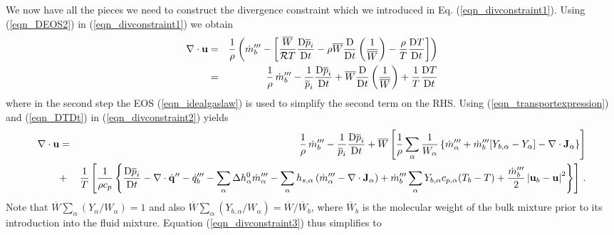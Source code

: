 \documentclass[11pt]{book}
\begin{document}
We now have all the pieces we need to construct the divergence constraint which we introduced in Eq. (\ref{eqn_divconstraint1}).  Using (\ref{eqn_DEOS2}) in (\ref{eqn_divconstraint1}) we obtain
\begin{eqnarray}
\label{eqn_divconstraint2}
\Div\mathbf{u} &=& \frac{1}{\rho} \left( \dot{m}_b^{\tripleprime} -  \left[ \frac{\overline{W}}{\mathcal{R}T} \frac{\mbox{D}\overline{p}_i}{\mbox{D} t} -
\rho \overline{W} \frac{\mbox{D}}{\mbox{D} t}\left(\frac{1}{\overline{W}}\right) - \frac{\rho}{T} \frac{\mbox{D} T}{\mbox{D} t} \right] \right)  \nonumber \vspace{0.3cm} \\
&=& \frac{1}{\rho} \,\dot{m}_b^{\tripleprime} -  \frac{1}{\overline{p}_i} \frac{\mbox{D}\overline{p}_i}{\mbox{D} t} + \overline{W} \frac{\mbox{D}}{\mbox{D} t}\left(\frac{1}{\overline{W}}\right) +
\frac{1}{T} \frac{\mbox{D} T}{\mbox{D} t}
\end{eqnarray}
where in the second step the EOS (\ref{eqn_idealgaslaw}) is used to simplify the second term on the RHS.
Using (\ref{eqn_transportexpression}) and (\ref{eqn_DTDt}) in (\ref{eqn_divconstraint2}) yields
\begin{eqnarray}
\label{eqn_divconstraint3}
\Div\mathbf{u} &=& \frac{1}{\rho} \,\dot{m}_b^{\tripleprime} -  \frac{1}{\overline{p}_i} \frac{\mbox{D}\overline{p}_i}{\mbox{D} t} + \overline{W} \left[\frac{1}{\rho} \sum_\alpha \frac{1}{W_\alpha} \left\{  \dot{m}_\alpha^{\tripleprime} + \dot{m}_{b}^{\tripleprime}[Y_{b,\alpha} - Y_\alpha] - \Div \mathbf{J}_{\alpha} \right\} \right] \nonumber \vspace{0.3cm}\\
&+&  \frac{1}{T} \left[ \frac{1}{\rho c_p} \left\{ \frac{\mbox{D} \overline{p}_i }{\mbox{D} t} - \Div\dot{\mathbf{q}}^{\prime\prime} -\dq_b''' - \sum_\alpha \Delta h^0_\alpha \dot{m}_\alpha^{\tripleprime} - \sum_\alpha h_{s,\alpha}\left(  \dot{m}_\alpha^{\tripleprime} - \Div \mathbf{J}_{\alpha} \right) + \dot{m}_{b}^{\tripleprime} \sum_\alpha Y_{b,\alpha} c_{p,\alpha}(T_b-T) + \frac{\dot{m}_{b}^{\tripleprime}}{2}\left|\mathbf{u}_b-\mathbf{u}\right|^2 \right\} \right] \,\mbox{.} \nonumber \vspace{0.3cm}\\
\end{eqnarray}
Note that $\overline{W} \sum_\alpha (Y_\alpha/W_\alpha) = 1$ and also $\overline{W} \sum_\alpha (Y_{b,\alpha}/W_\alpha) = \overline{W}/\overline{W}_b$,
where $\overline{W}_b$ is the molecular weight of the bulk mixture prior to its introduction into the fluid mixture.  Equation (\ref{eqn_divconstraint3}) thus simplifies to
\end{document}
